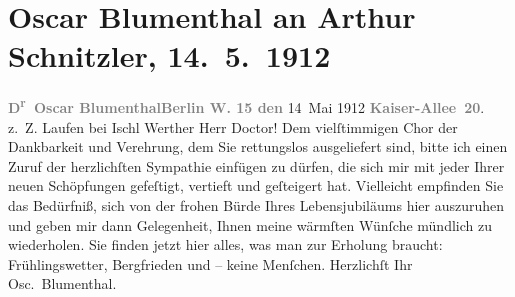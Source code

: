 

               \section[Oscar Blumenthal an Arthur Schnitzler, 14. 5. 1912]{ Oscar Blumenthal an Arthur Schnitzler, 14. 5. 1912}\nopagebreak{}\rehead{ }\begin{ledgroupsized}[t]{13cm}\normalsize\beginnumbering{} \toendnotes[C]{\smallbreak\pagebreak[2]} 
\toendnotes[C]{\smallbreak}\pstart
           {\pb}\textcolor{gray}{\textbf{D\textsuperscript{r} Oscar
                                Blumenthal}}\hfill \textcolor{gray}{\textbf{Berlin W. 15 den}}{ }14 Mai 1912\pend
           \pstart
           \raggedleft{}\textcolor{gray}{\textbf{Kaiser-Allee 20}}.{\\}z. Z. Laufen bei Ischl\pend
           \pstart\center{}Werther Herr Doctor!\pend\pstart
           Dem vielſtimmigen Chor der Dankbarkeit und Verehrung, dem Sie \label{K_L02064_1v}\label{K_L02064_1h} rettungslos ausgeliefert sind, bitte
                    ich einen Zuruf der herzlichſten Sympathie einfügen zu dürfen, die sich mir mit
                    jeder Ihrer neuen Schöpfungen gefeſtigt, vertieft und geſteigert hat. Vielleicht
                    empfinden Sie das Bedürfniß, sich von der frohen Bürde Ihres Lebensjubiläums
                    hier auszuruhen und geben mir dann Gelegenheit, Ihnen meine wärmſten Wünſche
                    mündlich zu wiederholen. Sie finden jetzt hier alles, was man zur Erholung
                    braucht: Frühlingswetter, Bergfrieden und – keine Menſchen. Herzlichſt Ihr\pend
           \pstart \spacefill\mbox{Osc. Blumenthal.}\pend{}\endnumbering{}\end{ledgroupsized}  \newcommand{\dateiname}{L02064}\newcommand{\titel}{Oscar Blumenthal an Arthur Schnitzler, 14. 5. 1912}\newcommand{\editorInnen}{Martin Anton Müller und Gerd-Hermann Susen}
            \footnotesize
\begin{ledgroupsized}[t]{11.5cm}
\end{ledgroupsized}
         
      